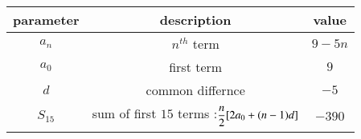 \begin{tabular}{|c|c|c|}
\hline
     \textbf{parameter} & \textbf{description} & \textbf{value} \\
     \hline
     $a_n$ & $n^{th}$ term & $9 - 5n$ \\
     \hline
     $a_0$ & first term & $9$\\
     \hline
     $d$ & common differnce & $-5$ \\
     \hline
     $S_{15}$ &  sum of first $15$ terms :$\dfrac{n}{2\vphantom{\brak{0.1}}} [2a_0 + (n-1)d]$ & $-390$ \\
     \hline
\end{tabular}
